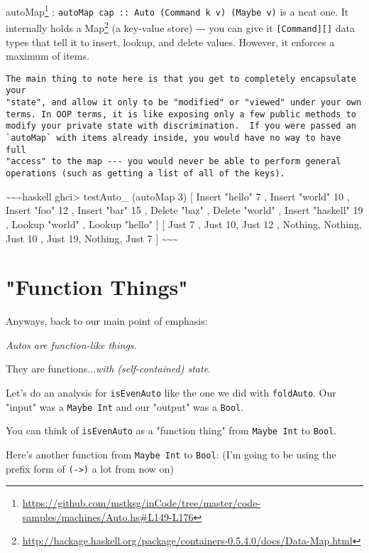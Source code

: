 \documentclass[]{article}
\renewcommand{\href}[2]{#2\footnote{\url{#1}}}
\begin{document}
\href{https://github.com/mstksg/inCode/tree/master/code-samples/machines/Auto.hs\#L149-L176}{autoMap}
: \texttt{autoMap\ cap\ ::\ Auto\ (Command\ k\ v)\ (Maybe\ v)} is a neat one. It
internally holds a
\href{http://hackage.haskell.org/package/containers-0.5.4.0/docs/Data-Map.html}{Map}
(a key-value store) -\/-\/- you can give it \texttt{{[}Command{]}{[}{]}} data
types that tell it to insert, lookup, and delete values. However, it enforces a
maximum of items.

\begin{verbatim}
The main thing to note here is that you get to completely encapsulate your
"state", and allow it only to be "modified" or "viewed" under your own
terms. In OOP terms, it is like exposing only a few public methods to
modify your private state with discrimination.  If you were passed an
`autoMap` with items already inside, you would have no way to have full
"access" to the map --- you would never be able to perform general
operations (such as getting a list of all of the keys).
\end{verbatim}

\textasciitilde{}\textasciitilde{}\textasciitilde{}haskell ghci\textgreater{}
testAuto\_ (autoMap 3) \textbar{} {[} Insert "hello" 7 \textbar{} , Insert
"world" 10 \textbar{} , Insert "foo" 12 \textbar{} , Insert "bar" 15 \textbar{}
, Delete "baz" \textbar{} , Delete "world" \textbar{} , Insert "haskell" 19
\textbar{} , Lookup "world" \textbar{} , Lookup "hello" \textbar{} {]} {[} Just
7 , Just 10, Just 12 , Nothing, Nothing, Just 10 , Just 19, Nothing, Just 7 {]}
\textasciitilde{}\textasciitilde{}\textasciitilde{}

\section{"Function Things"}

Anyways, back to our main point of emphasis:

\emph{Autos are function-like things}.

They are functions...\emph{with (self-contained) state}.

Let's do an analysis for \texttt{isEvenAuto} like the one we did with
\texttt{foldAuto}. Our "input" was a \texttt{Maybe\ Int} and our "output" was a
\texttt{Bool}.

You can think of \texttt{isEvenAuto} as a "function thing" from
\texttt{Maybe\ Int} to \texttt{Bool}.

Here's another function from \texttt{Maybe\ Int} to \texttt{Bool}: (I'm going to
be using the prefix form of \texttt{(-\textgreater{})} a lot from now on)
\end{document}
